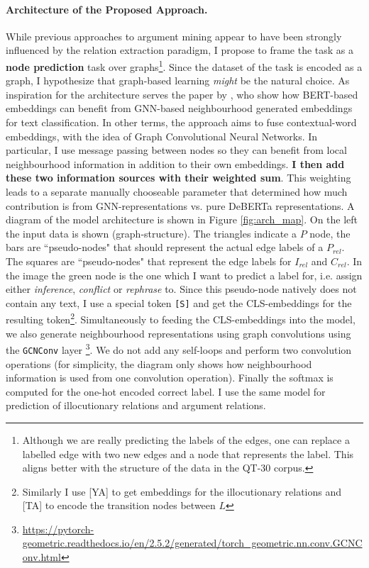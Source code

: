 \documentclass[11pt]{article}
\begin{document}
\paragraph{Architecture of the Proposed Approach.} While previous approaches to argument mining appear to have been strongly influenced by the relation extraction paradigm, I propose to frame the task as a \textbf{node prediction} task over graphs\footnote{Although we are really predicting the labels of the edges, one can replace a labelled edge with two new edges and a node that represents the label. This aligns better with the structure of the data in the QT-30 corpus.}. Since the dataset of the task is encoded as a graph, I hypothesize that graph-based learning \textit{might} be the natural choice. As inspiration for the architecture serves the paper by \citet{lin_bertgcn_2021}, who show how BERT-based embeddings can benefit from GNN-based neighbourhood generated embeddings for text classification. In other terms, the approach aims to fuse contextual-word embeddings, with the idea of Graph Convolutional Neural Networks. In particular, I use message passing between nodes so they can benefit from local neighbourhood information in addition to their own embeddings. \textbf{I then add these two information sources with their weighted sum}. This weighting leads to a separate manually chooseable parameter that determined how much contribution is from GNN-representations vs. pure DeBERTa representations. A diagram of the model architecture is shown in Figure \ref{fig:arch_map}. On the left the input data is shown (graph-structure). The triangles indicate a $P$ node, the bars are ``pseudo-nodes" that should represent the actual edge labels of a $P_{rel}$. The squares are ``pseudo-nodes" that represent the edge labels for $I_{rel}$ and $C_{rel}$. In the image the green node is the one which I want to predict a label for, i.e. assign either \textit{inference}, \textit{conflict} or \textit{rephrase} to. Since this pseudo-node natively does not contain any text, I use a special token \verb|[S]| and get the CLS-embeddings for the resulting token\footnote{Similarly I use [YA] to get embeddings for the illocutionary relations and [TA] to encode the transition nodes between $L$ }. Simultaneously to feeding the CLS-embeddings into the model, we also generate neighbourhood representations using graph convolutions using the \verb|GCNConv| layer \footnote{\url{https://pytorch-geometric.readthedocs.io/en/2.5.2/generated/torch_geometric.nn.conv.GCNConv.html}}. We do not add any self-loops and perform two convolution operations (for simplicity, the diagram only shows how neighbourhood information is used from one convolution operation). Finally the softmax is computed for the one-hot encoded correct label. I use the same model for prediction of illocutionary relations and argument relations.
\end{document}
